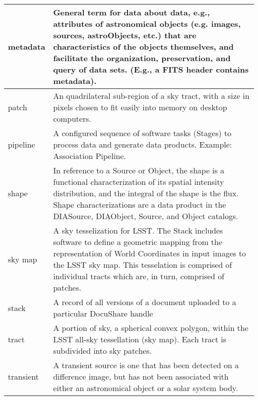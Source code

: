 \begin{longtable}{|l|p{}|}
metadata & General term for data about data, e.g., attributes of astronomical objects (e.g. images, sources, astroObjects, etc.) that are characteristics of the objects themselves, and facilitate the organization, preservation, and query of data sets. (E.g., a \gls{FITS} header contains \gls{metadata}). \\\hline
patch & An quadrilateral sub-region of a sky \gls{tract}, with a size in pixels chosen to fit easily into memory on desktop computers. \\\hline
pipeline & A configured sequence of software tasks (Stages) to process data and generate data products. Example: \gls{Association Pipeline}. \\\hline
shape & In reference to a Source or \gls{Object}, the \gls{shape} is a functional characterization of its spatial intensity distribution, and the integral of the \gls{shape} is the \gls{flux}. Shape characterizations are a data product in the \gls{DIASource}, \gls{DIAObject}, Source, and \gls{Object} catalogs. \\\hline
sky map & A sky tesselization for \gls{LSST}. The Stack includes software to define a geometric mapping from the representation of World Coordinates in input images to the \gls{LSST} \gls{sky map}. This tesselation is comprised of individual tracts which are, in turn, comprised of patches. \\\hline
stack & A record of all versions of a document uploaded to a particular \gls{DocuShare} handle \\\hline
tract & A portion of sky, a spherical convex polygon, within the \gls{LSST} all-sky tessellation (\gls{sky map}). Each \gls{tract} is subdivided into sky patches. \\\hline
transient & A \gls{transient} source is one that has been detected on a difference image, but has not been associated with either an \gls{astronomical object} or a solar system body. \\\hline
\end{longtable}
